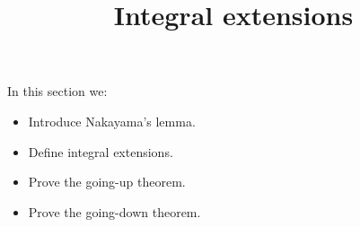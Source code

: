 \documentclass{ximera}
\title{Integral extensions}
\begin{document}
\begin{abstract}
\end{abstract}

\maketitle

In this section we:

\begin{itemize}
\item Introduce Nakayama's lemma.
\item Define integral extensions.
\item Prove the going-up theorem.
\item Prove the going-down theorem.
\end{itemize}
\end{document}
